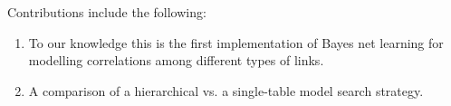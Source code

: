 \documentclass{article}
\begin{document}


Contributions include the following:

\begin{enumerate}
\item To our knowledge this is the first implementation of Bayes net learning for modelling correlations among different types of links.
\item A comparison of a hierarchical vs. a single-table model search strategy.
\end{enumerate}
\end{document}
